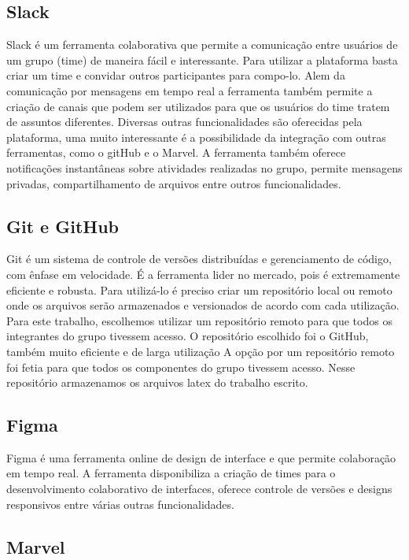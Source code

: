 \subsection{Slack}
Slack \cite{slack} é um ferramenta colaborativa que permite a comunicação entre usuários de um grupo (time) de maneira fácil e interessante. Para utilizar a plataforma basta criar um time e convidar outros participantes para compo-lo. Alem da comunicação por mensagens em tempo real a ferramenta também permite a criação de canais que podem ser utilizados para que os usuários do time tratem de assuntos diferentes. Diversas outras funcionalidades são oferecidas pela plataforma, uma muito interessante é a possibilidade da integração com outras ferramentas, como o gitHub e o Marvel.  A ferramenta também oferece notificações instantâneas sobre atividades realizadas no grupo, permite mensagens privadas, compartilhamento de arquivos entre outros funcionalidades.

\subsection{Git e GitHub}

Git \cite{git} é um sistema de controle de versões distribuídas e gerenciamento de código, com ênfase em velocidade. É a ferramenta lider no mercado, pois é extremamente eficiente e robusta. Para utilizá-lo é preciso criar um repositório local ou remoto onde os arquivos serão armazenados e versionados de acordo com cada utilização. Para este trabalho, escolhemos utilizar um repositório remoto para que todos os integrantes do grupo tivessem acesso. O repositório escolhido foi o GitHub, também muito eficiente e de larga utilização A opção por um repositório remoto foi fetia para que todos os componentes do grupo tivessem acesso. Nesse repositório armazenamos os arquivos latex do trabalho escrito.

\subsection{Figma}

Figma \cite{figma} é uma ferramenta online de design de interface e que permite colaboração em tempo real. A ferramenta disponibiliza a criação de times para o desenvolvimento colaborativo de interfaces, oferece controle de versões e designs responsivos entre várias outras funcionalidades.


\subsection{Marvel}

